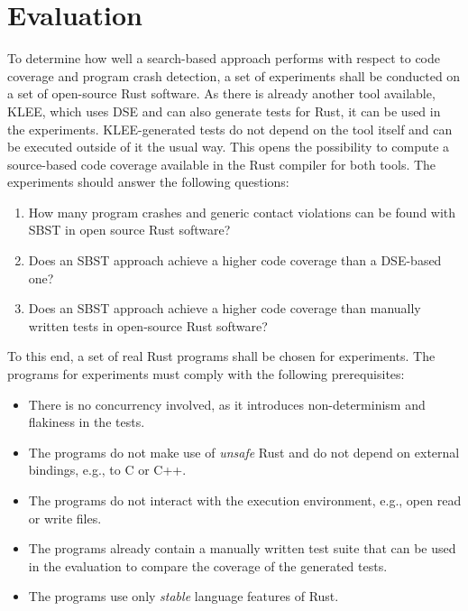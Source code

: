 \documentclass{article}
\begin{document}
\section{Evaluation}
To determine how well a search-based approach performs with respect to code coverage and program crash detection, a set of experiments shall be conducted on a set of open-source Rust software. As there is already another tool available, KLEE, which uses \ac{DSE} and can also generate tests for Rust, it can be used in the experiments. KLEE-generated tests do not depend on the tool itself and can be executed outside of it the usual way. This opens the possibility to compute a source-based code coverage available in the Rust compiler for both tools. The experiments should answer the following questions: 


\begin{enumerate}[start=1, label={\bfseries RQ\arabic*:}]
    \item How many program crashes and generic contact violations can be found with \ac{SBST} in open source Rust software?
    \item Does an \ac{SBST} approach achieve a higher code coverage than a \ac{DSE}-based one?
    \item Does an \ac{SBST} approach achieve a higher code coverage than manually written tests in open-source Rust software?
\end{enumerate}
To this end, a set of real Rust programs shall be chosen for experiments. The programs for experiments must comply with the following prerequisites:
\begin{itemize}
    \item There is no concurrency involved, as it introduces non-determinism and flakiness in the tests.
    \item The programs do not make use of \textit{unsafe} Rust and do not depend on external bindings, e.g., to C or C++.
    \item The programs do not interact with the execution environment, e.g., open read or write files.
    \item The programs already contain a manually written test suite that can be used in the evaluation to compare the coverage of the generated tests. 
    \item The programs use only \textit{stable} language features of Rust.
\end{itemize}


\appendix




\end{document}
